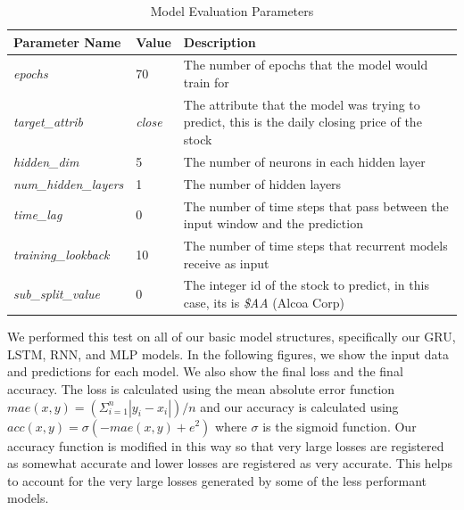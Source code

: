 \documentclass{ledger}
\begin{document}
\begin{table}[H]
    \begin{center}
        \caption{{Model Evaluation Parameters}}
        \label{tab:evalParams}
        \bgroup
        \def\arraystretch{1.2}
        \begin{tabular}{|p{4cm}|p{1cm}|p{8cm}|}
            \hline
            \textbf{Parameter Name} & \textbf{Value} & \textbf{Description}\\
            \hline
            \textit{epochs} & 70 & The number of epochs that the model would train for\\
            \hline
            \textit{target\_attrib} & \textit{close} & The attribute that the model was trying to predict, this is the daily closing price of the stock\\
            \hline
            \textit{hidden\_dim} & 5 & The number of neurons in each hidden layer\\
            \hline
            \textit{num\_hidden\_layers} & 1 & The number of hidden layers\\
            \hline
            \textit{time\_lag} & 0 & The number of time steps that pass between the input window and the prediction\\
            \hline
            \textit{training\_lookback} & 10 & The number of time steps that recurrent models receive as input\\
            \hline
            \textit{sub\_split\_value} & 0 & The integer id of the stock to predict, in this case, its is \textit{\$AA} (Alcoa Corp)\\
            \hline
        \end{tabular}
        \egroup
    \end{center}
\end{table}

We performed this test on all of our basic model structures, specifically our GRU, LSTM, RNN, and MLP models. In the following figures, we show the input data and predictions for each model.  We also show the final loss and the final accuracy.  The loss is calculated using the mean absolute error function
$mae(x, y) = (\Sigma^n_{i=1} |y_i - x_i|) / n$ and our accuracy is calculated using
$acc(x, y) = \sigma(-mae(x, y)+e^2)$ where $\sigma$ is the sigmoid function.
Our accuracy function is modified in this way so that very large losses are registered as somewhat accurate and lower losses are registered as very accurate.  This helps to account for the very large losses generated by some of the less performant models.
\end{document}
